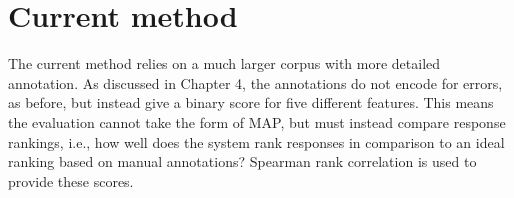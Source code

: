%
%
%


\section{Current method}

The current method relies on a much larger corpus with more detailed annotation. As discussed in Chapter 4, the annotations do not encode for errors, as before, but instead give a binary score for five different features. This means the evaluation cannot take the form of MAP, but must instead compare response rankings, i.e., how well does the system rank responses in comparison to an ideal ranking based on manual annotations? Spearman rank correlation is used to provide these scores.

